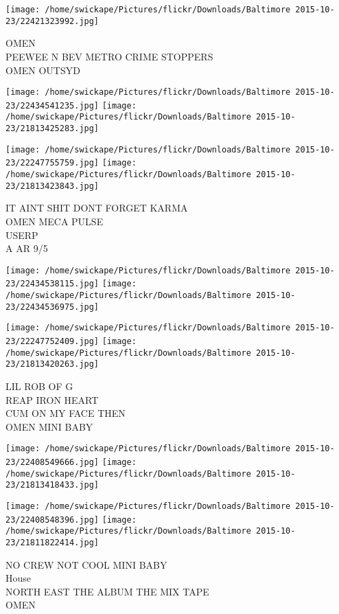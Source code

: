 \documentclass[10pt,letterpaper]{article}
\begin{document}
\vspace{0.25in}
\texttt{[image: /home/swickape/Pictures/flickr/Downloads/Baltimore 2015-10-23/22421323992.jpg]}

OMEN\\
PEEWEE N BEV METRO CRIME STOPPERS\\
OMEN OUTSYD\\
\pagebreak

\texttt{[image: /home/swickape/Pictures/flickr/Downloads/Baltimore 2015-10-23/22434541235.jpg]}
\texttt{[image: /home/swickape/Pictures/flickr/Downloads/Baltimore 2015-10-23/21813425283.jpg]}

\texttt{[image: /home/swickape/Pictures/flickr/Downloads/Baltimore 2015-10-23/22247755759.jpg]}
\texttt{[image: /home/swickape/Pictures/flickr/Downloads/Baltimore 2015-10-23/21813423843.jpg]}

IT AINT SHIT DONT FORGET KARMA\\
OMEN MECA PULSE\\
USERP\\
A AR 9/5\\
\pagebreak

\texttt{[image: /home/swickape/Pictures/flickr/Downloads/Baltimore 2015-10-23/22434538115.jpg]}
\texttt{[image: /home/swickape/Pictures/flickr/Downloads/Baltimore 2015-10-23/22434536975.jpg]}

\texttt{[image: /home/swickape/Pictures/flickr/Downloads/Baltimore 2015-10-23/22247752409.jpg]}
\texttt{[image: /home/swickape/Pictures/flickr/Downloads/Baltimore 2015-10-23/21813420263.jpg]}

LIL ROB OF G\\
REAP IRON HEART\\
CUM ON MY FACE THEN\\
OMEN MINI BABY\\
\pagebreak

\texttt{[image: /home/swickape/Pictures/flickr/Downloads/Baltimore 2015-10-23/22408549666.jpg]}
\texttt{[image: /home/swickape/Pictures/flickr/Downloads/Baltimore 2015-10-23/21813418433.jpg]}

\texttt{[image: /home/swickape/Pictures/flickr/Downloads/Baltimore 2015-10-23/22408548396.jpg]}
\texttt{[image: /home/swickape/Pictures/flickr/Downloads/Baltimore 2015-10-23/21811822414.jpg]}

NO CREW NOT COOL MINI BABY\\
House\\
NORTH EAST THE ALBUM THE MIX TAPE\\
OMEN\\
\pagebreak
\end{document}
